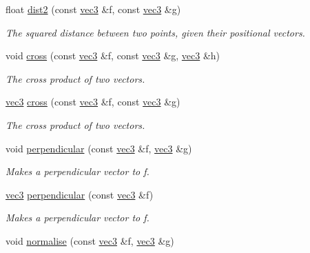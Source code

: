 \begin{DoxyCompactItemize}
\mbox{\label{namespacephysim_1_1math_a3bde831a582dcf1b601ee7b70a1cb806}} 
float \hyperlink{namespacephysim_1_1math_a3bde831a582dcf1b601ee7b70a1cb806}{dist2} (const \hyperlink{structphysim_1_1math_1_1vec3}{vec3} \&f, const \hyperlink{structphysim_1_1math_1_1vec3}{vec3} \&g)
\begin{DoxyCompactList}\small\item\em The squared distance between two points, given their positional vectors. \end{DoxyCompactList}\item 
void \hyperlink{namespacephysim_1_1math_a8f3b856b6e82c3703833395420d3541d}{cross} (const \hyperlink{structphysim_1_1math_1_1vec3}{vec3} \&f, const \hyperlink{structphysim_1_1math_1_1vec3}{vec3} \&g, \hyperlink{structphysim_1_1math_1_1vec3}{vec3} \&h)
\begin{DoxyCompactList}\small\item\em The cross product of two vectors. \end{DoxyCompactList}\item 
\hyperlink{structphysim_1_1math_1_1vec3}{vec3} \hyperlink{namespacephysim_1_1math_a2ee48b2fd6bc80eb526a0ec81fe60f54}{cross} (const \hyperlink{structphysim_1_1math_1_1vec3}{vec3} \&f, const \hyperlink{structphysim_1_1math_1_1vec3}{vec3} \&g)
\begin{DoxyCompactList}\small\item\em The cross product of two vectors. \end{DoxyCompactList}\item 
void \hyperlink{namespacephysim_1_1math_a4f57ea985280db4b2a313178500a38dd}{perpendicular} (const \hyperlink{structphysim_1_1math_1_1vec3}{vec3} \&f, \hyperlink{structphysim_1_1math_1_1vec3}{vec3} \&g)
\begin{DoxyCompactList}\small\item\em Makes a perpendicular vector to {\itshape f}. \end{DoxyCompactList}\item 
\hyperlink{structphysim_1_1math_1_1vec3}{vec3} \hyperlink{namespacephysim_1_1math_a0520988ecea5a25c000ce3bc22a695ed}{perpendicular} (const \hyperlink{structphysim_1_1math_1_1vec3}{vec3} \&f)
\begin{DoxyCompactList}\small\item\em Makes a perpendicular vector to {\itshape f}. \end{DoxyCompactList}\item 
void \hyperlink{namespacephysim_1_1math_ab214b019b2cf8507d2a632ad0ec6075b}{normalise} (const \hyperlink{structphysim_1_1math_1_1vec3}{vec3} \&f, \hyperlink{structphysim_1_1math_1_1vec3}{vec3} \&g)

\end{DoxyCompactItemize}
